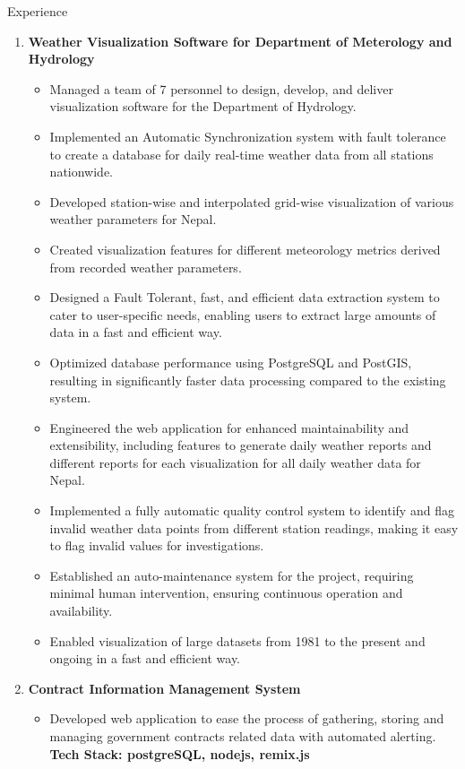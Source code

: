\documentclass{resume} %
\begin{document}
\begin{rSection}{Experience}
    \begin{enumerate}
        \item \textbf{Weather Visualization Software for Department of Meterology and Hydrology}
              \begin{itemize}
                  \item Managed a team of 7 personnel to design, develop, and deliver visualization software for the Department of Hydrology.
                  \item Implemented an Automatic Synchronization system with fault tolerance to create a database for daily real-time weather data from all stations nationwide.
                  \item Developed station-wise and interpolated grid-wise visualization of various weather parameters for Nepal.
                  \item Created visualization features for different meteorology metrics derived from recorded weather parameters.
                  \item Designed a Fault Tolerant, fast, and efficient data extraction system to cater to user-specific needs, enabling users to extract large amounts of data in a fast and efficient way.
                  \item Optimized database performance using PostgreSQL and PostGIS, resulting in significantly faster data processing compared to the existing system.
                  \item Engineered the web application for enhanced maintainability and extensibility, including features to generate daily weather reports and different reports for each visualization for all daily weather data for Nepal.
                  \item Implemented a fully automatic quality control system to identify and flag invalid weather data points from different station readings, making it easy to flag invalid values for investigations.
                  \item Established an auto-maintenance system for the project, requiring minimal human intervention, ensuring continuous operation and availability.
                  \item Enabled visualization of large datasets from 1981 to the present and ongoing in a fast and efficient way.
              \end{itemize}

        \item \textbf{Contract Information Management System}
              \begin{itemize}
                  \item Developed web application to ease the process of gathering, storing and managing government contracts related data with automated alerting.
                        \\ \footnotesize{\textbf{Tech Stack: postgreSQL, nodejs, remix.js }}
              \end{itemize}


\end{enumerate}
\end{rSection}
\end{document}
